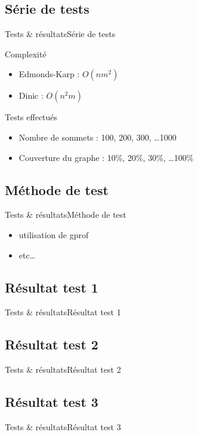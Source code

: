 \subsection{Série de tests}
\begin{frame}{Tests \& résultats}{Série de tests}
\begin{block}{Complexité}
  \begin{itemize}
    \item Edmonds-Karp : $O(nm^2)$
    \item Dinic : $O(n^2m)$
  \end{itemize}
\end{block}
\begin{block}{Tests effectués}
  \begin{itemize}
    \item Nombre de sommets : 100, 200, 300, \ldots 1000
    \item Couverture du graphe : 10\%, 20\%, 30\%, \ldots 100\%
  \end{itemize}
\end{block}
\end{frame}

\subsection{Méthode de test}
\begin{frame}{Tests \& résultats}{Méthode de test}
\begin{itemize}
\item utilisation de gprof
\item etc\ldots
\end{itemize}
\end{frame}

\subsection{Résultat test 1}
\begin{frame}{Tests \& résultats}{Résultat test 1}
\end{frame}

\subsection{Résultat test 2}
\begin{frame}{Tests \& résultats}{Résultat test 2}
\end{frame}

\subsection{Résultat test 3}
\begin{frame}{Tests \& résultats}{Résultat test 3}
\end{frame}